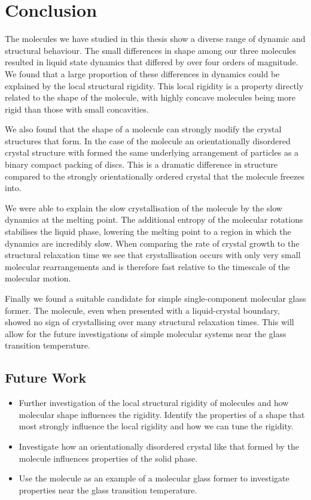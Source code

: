 \chapter{Conclusion}

The molecules we have studied in this thesis show a diverse range of dynamic and structural behaviour. The small differences in shape among our three molecules resulted in liquid state dynamics that differed by over four orders of magnitude. We found that a large proportion of these differences in dynamics could be explained by the local structural rigidity. This local rigidity is a property directly related to the shape of the molecule, with highly concave molecules being more rigid than those with small concavities.

We also found that the shape of a molecule can strongly modify the crystal structures that form. In the case of the \dcon molecule an orientationally disordered crystal structure with formed the same underlying arrangement of particles as a binary compact packing of discs. This is a dramatic difference in structure compared to the strongly orientationally ordered crystal that the \done molecule freezes into.

We were able to explain the slow crystallisation of the \done molecule by the slow dynamics at the melting point. The additional entropy of the molecular rotations stabilises the liquid phase, lowering the melting point to a region in which the dynamics are incredibly slow. When comparing the rate of crystal growth to the structural relaxation time we see that crystallisation occurs with only very small molecular rearrangements and is therefore fast relative to the timescale of the molecular motion.

Finally we found a suitable candidate for simple single-component molecular glass former. The \tri molecule, even when presented with a liquid-crystal boundary, showed no sign of crystallising over many structural relaxation times. This will allow for the future investigations of simple molecular systems near the glass transition temperature.


\section{Future Work}

\begin{itemize}
    \item Further investigation of the local structural rigidity of molecules and how molecular shape influences the rigidity. Identify the properties of a shape that most strongly influence the local rigidity and how we can tune the rigidity.
    \item Investigate how an orientationally disordered crystal like that formed by the \dcon molecule influences properties of the solid phase.
    \item Use the \tri molecule as an example of a molecular glass former to investigate properties near the glass transition temperature.
\end{itemize}

